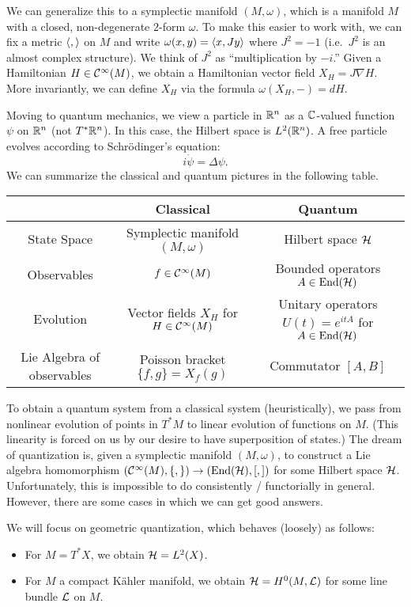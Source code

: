 \documentclass{article}
\begin{document}
We can generalize this to a symplectic manifold $(M, \omega)$, which is a manifold $M$ with a closed, non-degenerate $2$-form $\omega$.
To make this easier to work with, we can fix a metric $\left\langle ,  \right\rangle$ on $M$ and write $\omega(x, y) = \left\langle x, Jy \right\rangle$ where $J^2 = -1$ (i.e.\ $J^2$ is an almost complex structure).
We think of $J^2$ as ``multiplication by $-i$.''
Given a Hamiltonian $H \in \mathcal{C}^\infty(M)$, we obtain a Hamiltonian vector field $X_H = J \nabla H$.
More invariantly, we can define $X_H$ via the formula $\omega(X_H, -) = dH$.

Moving to quantum mechanics, we view a particle in $\mathbb{R}^n$ as a $\mathbb{C}$-valued function $\psi$ on $\mathbb{R}^n$ (not $T^*\mathbb{R}^n$).
In this case, the Hilbert space is $L^2(\mathbb{R}^n)$.
A free particle evolves according to Schr\"odinger's equation:
\[
	i \dot{\psi} = \Delta \psi.
\]
We can summarize the classical and quantum pictures in the following table.

\begin{center}
\begin{tabular}{c|c|c}
	& Classical & Quantum \\ \hline
	State Space & Symplectic manifold $(M, \omega)$ & Hilbert space $\mathcal{H}$ \\
	Observables & $f \in \mathcal{C}^\infty(M)$ & Bounded operators $A \in \operatorname{End}(\mathcal{H})$ \\
	Evolution & Vector fields $X_H$ for $H \in \mathcal{C}^\infty(M)$ & Unitary operators $U(t) = e^{itA}$ for $A \in \operatorname{End}(\mathcal{H})$ \\
	Lie Algebra of observables & Poisson bracket $\{ f, g \} = X_f(g)$ & Commutator $[A, B]$
\end{tabular}
\end{center}

To obtain a quantum system from a classical system (heuristically), we pass from nonlinear evolution of points in $T^* M$ to linear evolution of functions on $M$.
(This linearity is forced on us by our desire to have superposition of states.)
The dream of quantization is, given a symplectic manifold $(M, \omega)$, to construct a Lie algebra homomorphism $(\mathcal{C}^\infty(M), \{ , \}) \to (\operatorname{End}(\mathcal{H}), [ , ])$ for some Hilbert space $\mathcal{H}$.
Unfortunately, this is impossible to do consistently / functorially in general.
However, there are some cases in which we can get good answers.

We will focus on geometric quantization, which behaves (loosely) as follows:
\begin{itemize}
	\item For $M = T^*X$, we obtain $\mathcal{H} = L^2(X)$.
	\item For $M$ a compact K\"ahler manifold, we obtain $\mathcal{H} = H^0(M, \mathcal{L})$ for some line bundle $\mathcal{L}$ on $M$.
\end{itemize}
\end{document}

